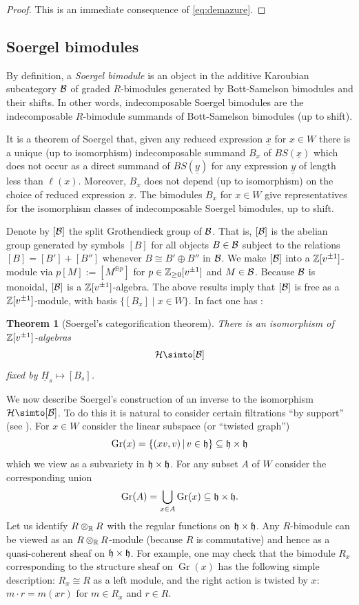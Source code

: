\documentclass[11pt]{amsart}
\numberwithin{equation}{section}
\def\un{\underline}
\newtheorem{thm}{Theorem}[section]
\theoremstyle{definition}
\theoremstyle{remark}
\DeclareMathOperator{\Gr}{Gr}
\begin{document}
\begin{proof} This is an immediate consequence of \eqref{eq:demazure}.
\end{proof}

\subsection{Soergel bimodules} \label{sec:SB}

By definition, a \emph{Soergel bimodule} is an object in the additive
Karoubian subcategory ${\mathcal{B}}$ of graded $R$-bimodules generated by Bott-Samelson bimodules and their shifts. In other words,
indecomposable Soergel bimodules are the indecomposable $R$-bimodule
summands of Bott-Samelson bimodules (up to shift).

It is a theorem of Soergel \cite{S3} that, given any reduced
expression $\un{x}$ for $x \in W$ there is a unique (up to
isomorphism) indecomposable summand $B_x$ of $BS(\un{x})$ which does
not occur as a direct summand of $BS(\un{y})$ for any expression
$\un{y}$ of length less than $\ell(x)$. Moreover, $B_x$ does not
depend (up to isomorphism) on the choice of reduced expression
$\un{x}$. The bimodules $B_x$ for $x \in W$ give representatives for
the isomorphism classes of indecomposable Soergel bimodules, up to
shift.

Denote by $[{\mathcal{B}}]$ the split Grothendieck group of ${\mathcal{B}}$. That is,
$[{\mathcal{B}}]$ is the abelian group generated by symbols $[B]$ for all
objects $B \in {\mathcal{B}}$ subject to the relations $[B] = [B'] + [B'']$
whenever $B \cong B' \oplus B''$ in ${\mathcal{B}}$. We make $[{\mathcal{B}}]$ into a
${\mathbb{Z}}[v^{\pm 1}]$-module via $p [M] := [M^{\oplus p}]$ for $p
\in {\mathbb{Z}}_{\ge 0}[v^{\pm 1}]$ and $M \in {\mathcal{B}}$. Because ${\mathcal{B}}$ is monoidal, $[{\mathcal{B}}]$ is a
${\mathbb{Z}}[v^{\pm 1}]$-algebra. The above results imply that $[{\mathcal{B}}]$ is
free as a ${\mathbb{Z}}[v^{\pm 1}]$-module, with basis $\{ [B_x] \; | \; x \in W
\}$. In fact one has \cite[Theorem 1.10]{S3}:

\begin{thm}[Soergel's categorification theorem] \label{thm: Soergel
    Catfn Thm} There is an isomorphism of ${\mathbb{Z}}[v^{\pm 1}]$-algebras
\[ \HC \simto  [\BC]
\]
fixed by $\un{H}_s  \mapsto [B_s]$.\end{thm}

We now describe Soergel's construction of an inverse to the
isomorphism $\HC \simto [\BC]$. To do this it is natural
to consider certain filtrations ``by support'' (see \cite[\S3 and \S5]{S3}). For $x\in W$ consider
the linear subspace (or ``twisted graph'')
\[
\Gr(x)=\{(xv,v)\,\vert\, v\in \hg\}\subseteq
\hg\times \hg
\]
which we view as a subvariety in ${\mathfrak h} \times {\mathfrak h}$. For any subset $A$
of $W$ consider the corresponding union
\[\Gr(A)=\bigcup_{x\in A}\Gr(x)\subseteq \hg\times \hg.\]
Let us identify $R \otimes_{\mathbb{R}} R$ with the regular functions on
${\mathfrak h} \times {\mathfrak h}$. Any $R$-bimodule can be viewed as an $R
\otimes_{{\mathbb{R}}} R$-module (because $R$ is commutative) and hence as a
quasi-coherent sheaf on ${\mathfrak h} \times {\mathfrak h}$. For example, one may check
that the bimodule $R_x$ corresponding to the structure sheaf on
$\Gr(x)$ has the following simple description: $R_x
\cong R$ as a left module, and the right action is twisted by $x$: $m
\cdot r = m(xr)$ for $m \in R_x$ and $r \in R$.
\end{document}
